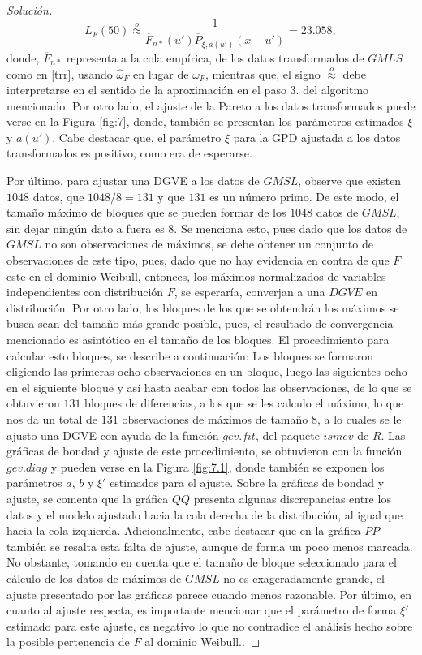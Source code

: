 \documentclass[10.5pt,notitlepage]{article}
\newenvironment{solucion}
  {\begin{proof}[Solución]}
  {\end{proof}}
\theoremstyle{plain}
\begin{document}
\begin{solucion}
\[
 L_{F}(50) \overset{o}{\approx}  \frac{1}{\overline{F}_{n*}(u')\overline{P}_{\xi,a(u')}(x - u')} = 23.058,
\]
donde, \(\overline{F}_{n*}\) representa a la cola empírica, de los datos transformados de \(GMLS\) como en \eqref{trr}, usando \(\hat{\omega}_{F}\) en lugar de \(\omega_{F}\), mientras que, el signo \(\overset{o}{\approx}\) debe interpretarse en el sentido de la aproximación en el paso 3. del algoritmo mencionado. Por otro lado, el ajuste de la Pareto a los datos transformados puede verse en la Figura \ref{fig:7}, donde, también se presentan los parámetros estimados \(\xi\) y \(a(u')\). Cabe destacar que, el parámetro \(\xi\) para la GPD ajustada a los datos transformados es positivo, como era de esperarse. 

Por último, para ajustar una DGVE a los datos de \(GMSL\), observe que existen \(1048\) datos, que \(1048/8 = 131\) y que \(131\) es un número primo. De este modo, el tamaño máximo de bloques que se pueden formar de los \(1048\) datos de \(GMSL\), sin dejar ningún dato a fuera es \(8\). Se menciona esto, pues dado que los datos de \(GMSL\) no son observaciones de máximos, se debe obtener un conjunto de observaciones de este tipo, pues, dado que no hay evidencia en contra de que \(F\) este en el dominio Weibull, entonces, los máximos normalizados de variables independientes con distribución \(F\), se esperaría, converjan a una \(DGVE\) en distribución. Por otro lado, los bloques de los que se obtendrán los máximos se busca sean del tamaño más grande posible, pues, el resultado de convergencia mencionado es asintótico en el tamaño de los bloques. El procedimiento para calcular esto bloques, se describe a continuación: Los bloques se formaron eligiendo las primeras ocho observaciones en un bloque, luego las siguientes ocho en el siguiente bloque y así hasta acabar con todos las observaciones, de lo que se obtuvieron \(131\) bloques de diferencias, a los que se les calculo el máximo, lo que nos da un total de \(131\) observaciones de máximos de tamaño \(8\),  a lo cuales se le ajusto una DGVE con ayuda de la función \(gev.fit\), del paquete \(ismev\) de \(R\). Las gráficas de bondad y ajuste de este procedimiento, se obtuvieron con la función \(gev.diag\) y pueden verse en la Figura \ref{fig:7.1}, donde también se exponen los parámetros \(a\), \(b\) y \(\xi'\) estimados para el ajuste. Sobre la gráficas de bondad y ajuste, se comenta que la gráfica \(QQ\) presenta algunas discrepancias entre los datos y el modelo ajustado hacia la cola derecha de la distribución, al igual que hacia la cola izquierda. Adicionalmente, cabe destacar que en la gráfica \(PP\) también se resalta esta falta de ajuste, aunque de forma un poco menos marcada. No obstante, tomando en cuenta que el tamaño de bloque seleccionado para el cálculo de los datos de máximos de \(GMSL\) no es exageradamente grande, el ajuste presentado por las gráficas parece cuando menos razonable. Por último, en cuanto al ajuste respecta, es importante mencionar que el parámetro de forma \(\xi'\) estimado para este ajuste, es negativo lo que no contradice el análisis hecho sobre la posible pertenencia de \(F\) al dominio Weibull..


\end{solucion}
\end{document}
